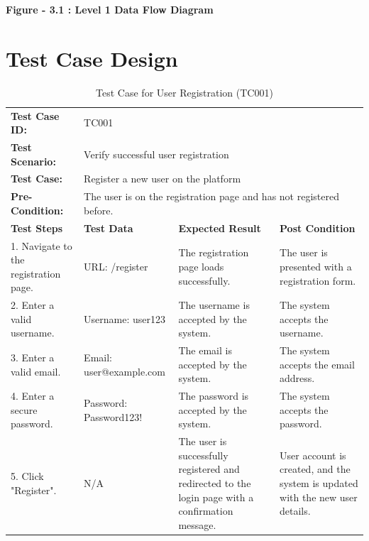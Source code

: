 \documentclass{scrreprt}
\begin{document}
\begin{center}

    \parbox{0.8\textwidth}{ 
        \centering
        \textbf{Figure - 3.1 : Level 1 Data Flow Diagram}
    }
\end{center}

\chapter{Test Case Design}

\begin{longtable}{| m{2cm} | m{5cm} | m{4cm} | m{3cm} |}
\caption{Test Case for User Registration (TC001)}
\vspace{0.5cm} \\ \hline
\textbf{Test Case ID:} & \multicolumn{3}{l|}{TC001} \\ \hline
\textbf{Test Scenario:} & \multicolumn{3}{l|}{Verify successful user registration} \\ \hline
\textbf{Test Case:} & \multicolumn{3}{l|}{Register a new user on the platform} \\ \hline
\textbf{Pre-Condition:} & \multicolumn{3}{l|}{The user is on the registration page and has not registered before.} \\ \hline
\textbf{Test Steps} & \textbf{Test Data} & \textbf{Expected Result} & \textbf{Post Condition} \\ \hline
1. Navigate to the registration page. & URL: /register & The registration page loads successfully. & The user is presented with a registration form. \\ \hline
2. Enter a valid username. & Username: user123 & The username is accepted by the system. & The system accepts the username. \\ \hline
3. Enter a valid email. & Email: user@example.com & The email is accepted by the system. & The system accepts the email address. \\ \hline
4. Enter a secure password. & Password: Password123! & The password is accepted by the system. & The system accepts the password. \\ \hline
5. Click "Register". & N/A & The user is successfully registered and redirected to the login page with a confirmation message. & User account is created, and the system is updated with the new user details. \\ \hline
\end{longtable}

\vspace{1cm}
\newpage
\end{document}
